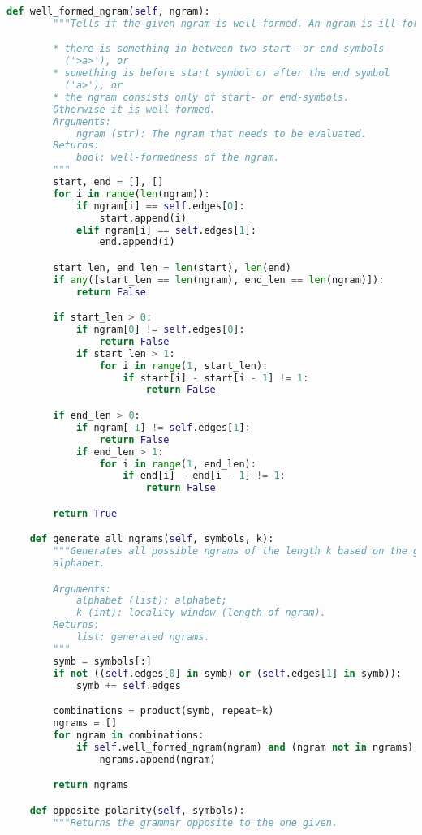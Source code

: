 \begin{lstlisting}[language=Python]
    def well_formed_ngram(self, ngram):
        """Tells if the given ngram is well-formed. An ngram is ill-formed if:

        * there is something in-between two start- or end-symbols
          ('>a>'), or
        * something is before start symbol or after the end symbol
          ('a>'), or
        * the ngram consists only of start- or end-symbols.
        Otherwise it is well-formed.
        Arguments:
            ngram (str): The ngram that needs to be evaluated.
        Returns:
            bool: well-formedness of the ngram.
        """
        start, end = [], []
        for i in range(len(ngram)):
            if ngram[i] == self.edges[0]:
                start.append(i)
            elif ngram[i] == self.edges[1]:
                end.append(i)

        start_len, end_len = len(start), len(end)
        if any([start_len == len(ngram), end_len == len(ngram)]):
            return False

        if start_len > 0:
            if ngram[0] != self.edges[0]:
                return False
            if start_len > 1:
                for i in range(1, start_len):
                    if start[i] - start[i - 1] != 1:
                        return False

        if end_len > 0:
            if ngram[-1] != self.edges[1]:
                return False
            if end_len > 1:
                for i in range(1, end_len):
                    if end[i] - end[i - 1] != 1:
                        return False

        return True

    def generate_all_ngrams(self, symbols, k):
        """Generates all possible ngrams of the length k based on the given
        alphabet.

        Arguments:
            alphabet (list): alphabet;
            k (int): locality window (length of ngram).
        Returns:
            list: generated ngrams.
        """
        symb = symbols[:]
        if not ((self.edges[0] in symb) or (self.edges[1] in symb)):
            symb += self.edges

        combinations = product(symb, repeat=k)
        ngrams = []
        for ngram in combinations:
            if self.well_formed_ngram(ngram) and (ngram not in ngrams):
                ngrams.append(ngram)

        return ngrams

    def opposite_polarity(self, symbols):
        """Returns the grammar opposite to the one given.


\end{lstlisting}
